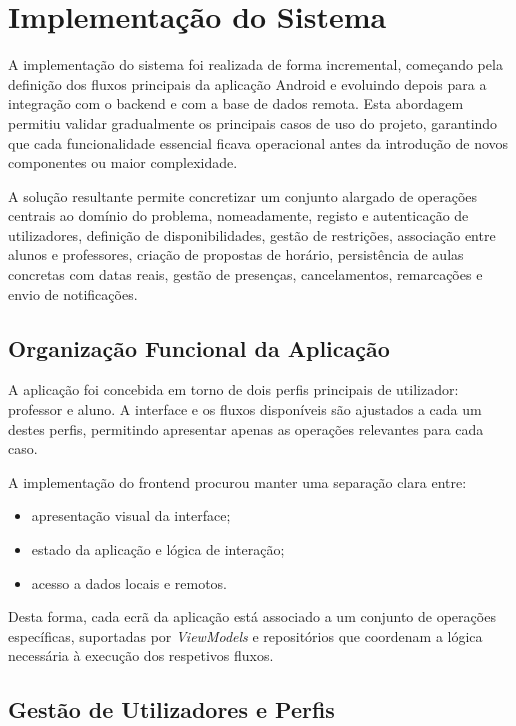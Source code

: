 %
%
\chapter{Implementação do Sistema} \label{cap:implementacao}

A implementação do sistema foi realizada de forma incremental, começando pela definição dos fluxos principais da aplicação
Android e evoluindo depois para a integração com o backend e com a base de dados remota.
Esta abordagem permitiu validar gradualmente os principais casos de uso do projeto, garantindo que cada funcionalidade
essencial ficava operacional antes da introdução de novos componentes ou maior complexidade.

A solução resultante permite concretizar um conjunto alargado de operações centrais ao domínio do problema, nomeadamente, registo e autenticação de utilizadores, definição de disponibilidades, gestão de restrições, associação entre alunos e professores, criação de propostas de horário, persistência de aulas concretas com datas reais, gestão de presenças, cancelamentos, remarcações e envio de notificações.

\section{Organização Funcional da Aplicação}

A aplicação foi concebida em torno de dois perfis principais de utilizador: professor e aluno.
A interface e os fluxos disponíveis são ajustados a cada um destes perfis, permitindo apresentar apenas as operações relevantes para cada caso.

A implementação do frontend procurou manter uma separação clara entre:

\begin{itemize}
    \item apresentação visual da interface;
    \item estado da aplicação e lógica de interação;
    \item acesso a dados locais e remotos.
\end{itemize}

Desta forma, cada ecrã da aplicação está associado a um conjunto de operações específicas,
suportadas por \textit{ViewModels} e repositórios que coordenam a lógica necessária à execução dos respetivos fluxos.

\section{Gestão de Utilizadores e Perfis}

